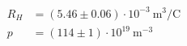 \begin{align*}
R_H &= (5.46 \pm 0.06)\cdot 10^{-3} ~\text{m}^3/\text{C} \\
p &= (114\pm1) \cdot 10^{19} ~\text{m}^{-3}
\end{align*}